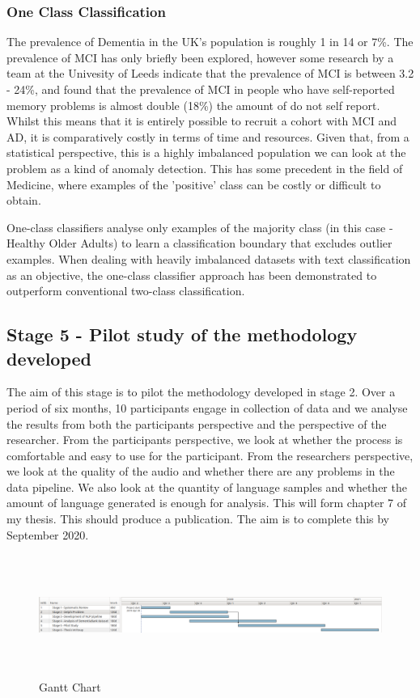 \documentclass[11pt]{article}
\begin{document}
\subsubsection*{One Class Classification}
The prevalence of Dementia in the UK's population is roughly 1 in 14 or 7\%. The prevalence of MCI has only briefly been explored, however some research by a team at the Univesity of Leeds indicate that the prevalence of MCI is between 3.2 - 24\%, and found that the prevalence of MCI in people who have self-reported memory problems is almost double (18\%) the amount of do not self report. Whilst this means that it is entirely possible to recruit a cohort with MCI and AD, it is comparatively costly in terms of time and resources. Given that, from a statistical perspective, this is a highly imbalanced population we can look at the problem as a kind of anomaly detection. This has some precedent in the field of Medicine, where examples of the 'positive' class can be costly or difficult to obtain. 
\par 
One-class classifiers analyse only examples of the majority class (in this case - Healthy Older Adults) to learn a classification boundary that excludes outlier examples. When dealing with heavily imbalanced datasets with text classification as an objective, the one-class classifier approach has been demonstrated to outperform conventional two-class classification.  

\subsection*{Stage 5 - Pilot study of the methodology developed}
The aim of this stage is to pilot the methodology developed in stage 2. Over a period of six months, 10 participants engage in collection of data and we analyse the results from both the participants perspective and the perspective of the researcher. From the participants perspective, we look at whether the process is comfortable and easy to use for the participant. From the researchers perspective, we look at the quality of the audio and whether there are any problems in the data pipeline. We also look at the quantity of language samples and whether the amount of language generated is enough for analysis. This will form chapter 7 of my thesis. This should produce a publication. The aim is to complete this by September 2020.

\begin{landscape}
\begin{figure}[H]
\centering
\includegraphics[width=650px, height=150px]{images/GanttChartUpdated.png}
\caption{Gantt Chart}
\end{figure}
\end{landscape}
\end{document}
